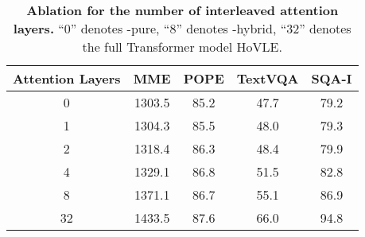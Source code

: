 \begin{table}[t!]
    \centering
    \small
    \begin{tabular}{c | c  c c c}
    \toprule
    Attention Layers & MME &  POPE & TextVQA & SQA-I \\
    \midrule
    \rowcolor{green!15}
    0 &1303.5 & 85.2 & 47.7 & 79.2 \\
    \midrule
    1 & 1304.3& 85.5 & 48.0 & 79.3 \\
    2 &  1318.4 & 86.3 & 48.4 & 79.9 \\
    4 & 1329.1 & 86.8 & 51.5 & 82.8 \\
    \rowcolor{yellow!15}
    8 &1371.1 & 86.7 & 55.1 & 86.9 \\
    \midrule
    32 & 1433.5 & 87.6 & 66.0 & 94.8 \\
    \bottomrule
    \end{tabular}
    \vspace{-1em}
    \caption{\textbf{Ablation for the number of interleaved attention layers.} ``0'' denotes \name{}-pure, ``8'' denotes \name{}-hybrid, ``32'' denotes the full Transformer model HoVLE.}
    \vspace{-1em}
    \label{tab:hybrid}
 \end{table}

